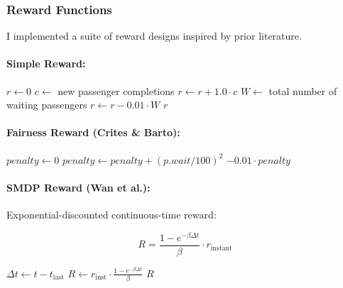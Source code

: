 \documentclass[10pt,twocolumn]{article}
\begin{document}
\subsubsection{Reward Functions}

I implemented a suite of reward designs inspired by prior literature.

\paragraph*{Simple Reward:}
\vspace{-0.2em}
\noindent
\begin{algorithm}[H]
\caption{Simple Reward Computation}
\begin{algorithmic}[1]
\State $r \gets 0$
\State $c \gets$ new passenger completions
\State $r \gets r + 1.0 \cdot c$
\State $W \gets$ total number of waiting passengers
\State $r \gets r - 0.01 \cdot W$
\State \Return $r$
\end{algorithmic}
\end{algorithm}

\paragraph*{Fairness Reward (Crites \& Barto):}
\vspace{-0.2em}
\noindent
\begin{algorithm}[H]
\caption{Fairness-Oriented Reward}
\begin{algorithmic}[1]
\State $penalty \gets 0$
    \State $penalty \gets penalty + (p.wait / 100)^2$
\EndFor
\State \Return $-0.01 \cdot penalty$
\end{algorithmic}
\end{algorithm}

\paragraph{SMDP Reward (Wan et al.):}

Exponential-discounted continuous-time reward\cite{WAN2024}:

\[
R = \frac{1 - e^{-\beta \Delta t}}{\beta} \cdot r_{\text{instant}}
\]
\vspace{-0.2em}
\noindent
\begin{algorithm}[H]
\caption{SMDP Reward Computation}
\begin{algorithmic}[1]
\State $\Delta t \gets t - t_{\text{last}}$
\State $R \gets r_{\text{inst}} \cdot \frac{1 - e^{-\beta \Delta t}}{\beta}$
\State \Return $R$
\end{algorithmic}
\end{algorithm}
\end{document}
